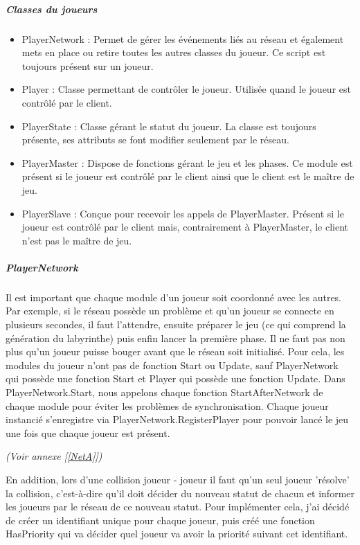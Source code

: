 \documentclass{article}
\begin{document}
\subparagraph{Classes du joueurs}

\begin{itemize}

\item PlayerNetwork : Permet de gérer les événements liés au réseau et également mets en place ou retire toutes les autres classes du joueur. Ce script est toujours présent sur un joueur.

\item Player : Classe permettant de contrôler le joueur. Utilisée quand le joueur est contrôlé par le client.

\item PlayerState : Classe gérant le statut du joueur. La classe est toujours présente, ses attributs se font modifier seulement par le réseau.

\item PlayerMaster : Dispose de fonctions gérant le jeu et les phases. Ce module est présent si le joueur est contrôlé par le client ainsi que le client est le maître de jeu.

\item PlayerSlave : Conçue pour recevoir les appels de PlayerMaster. Présent si le joueur est contrôlé par le client mais, contrairement à PlayerMaster, le client n'est pas le maître de jeu.

\end{itemize}

\subparagraph{PlayerNetwork}

Il est important que chaque module d'un joueur soit coordonné avec les autres. Par exemple, si le réseau possède un problème et qu'un joueur se connecte en plusieurs secondes, il faut l'attendre, ensuite préparer le jeu (ce qui comprend la génération du labyrinthe) puis enfin lancer la première phase. Il ne faut pas non plus qu'un joueur puisse bouger avant que le réseau soit initialisé.
Pour cela, les modules du joueur n'ont pas de fonction Start ou Update, sauf PlayerNetwork qui possède une fonction Start et Player qui possède une fonction Update. Dans PlayerNetwork.Start, nous appelons chaque fonction StartAfterNetwork de chaque module pour éviter les problèmes de synchronisation.
Chaque joueur instancié s'enregistre via PlayerNetwork.RegisterPlayer pour pouvoir lancé le jeu une fois que chaque joueur est présent.

\emph{(Voir annexe [\ref{NetA}])}

En addition, lors d'une collision joueur - joueur il faut qu'un seul joueur 'résolve' la collision, c'est-à-dire qu'il doit décider du nouveau statut de chacun et informer les joueurs par le réseau de ce nouveau statut.
Pour implémenter cela, j'ai décidé de créer un identifiant unique pour chaque joueur, puis créé une fonction HasPriority qui va décider quel joueur va avoir la priorité suivant cet identifiant.
\end{document}
